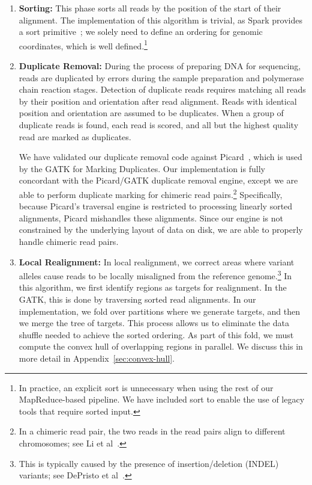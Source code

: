 \documentclass{acm_proc_article-sp}
\begin{document}
\begin{enumerate}
\item \textbf{Sorting:} This phase sorts all reads by the position of the start of their alignment. The implementation
of this algorithm is trivial, as Spark provides a sort primitive~\cite{zaharia10}; we solely need to define an
ordering for genomic coordinates, which is well defined.\footnote{In practice, an explicit sort is unnecessary when
using the rest of our MapReduce-based pipeline. We have included sort to enable the use of legacy tools that
require sorted input.}
\item \textbf{Duplicate Removal:} During the process of preparing DNA for sequencing, reads are duplicated by
errors during the sample preparation and polymerase chain reaction stages. Detection of duplicate reads
requires matching all reads by their position and orientation after read alignment. Reads with identical position
and orientation are assumed to be duplicates. When a group of duplicate reads is found, each read is scored,
and all but the highest quality read are marked as duplicates.

We have validated our duplicate removal code against Picard~\cite{picard}, which is used by the GATK
for Marking Duplicates. Our implementation is fully concordant with the Picard/GATK duplicate removal
engine, except we are able to perform duplicate marking for chimeric read pairs.\footnote{In a chimeric read pair,
the two reads in the read pairs align to different chromosomes; see Li et al~\cite{li10}.}
Specifically, because Picard's traversal engine is restricted to processing linearly sorted alignments,
Picard mishandles these alignments. Since our engine is not constrained by the underlying layout of data
on disk, we are able to properly handle chimeric read pairs.
\item \textbf{Local Realignment:} In local realignment, we correct areas where variant alleles cause reads to be
locally misaligned from the reference genome.\footnote{This is typically caused by the presence of
insertion/deletion (INDEL) variants; see DePristo et al~\cite{depristo11}.} In this algorithm, we first identify regions
as targets for realignment. In the GATK, this is done by traversing sorted read alignments. In our implementation,
we fold over partitions where we generate targets, and then we merge the tree of targets. This process allows us
to eliminate the data shuffle needed to achieve the sorted ordering. As part of this fold, we must
compute the convex hull of overlapping regions in parallel. We discuss this in more detail in
Appendix~\ref{sec:convex-hull}.


\end{enumerate}
\end{document}
